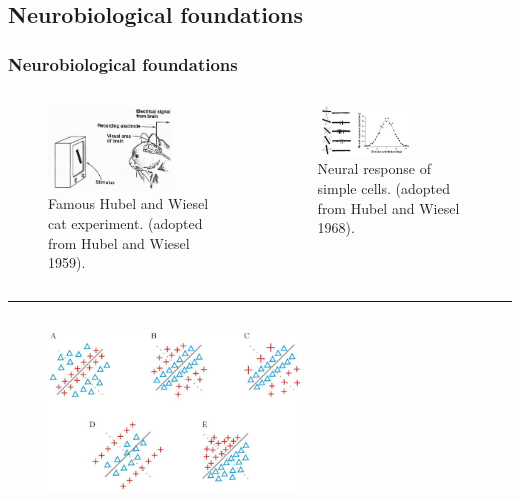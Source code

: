 \documentclass[a4paper,9pt]{beamer}
\theoremstyle{mytheoremstyle}
\begin{document}
\subsection{Neurobiological foundations}
\begin{frame}
\frametitle{Neurobiological foundations}
\begin{columns}
\begin{figure}
\begin{center}
  \includegraphics[width=0.75\textwidth]{res/hubel-experiment-cat.png}
\end{center}
	\caption{Famous Hubel and Wiesel cat experiment. (adopted from Hubel and Wiesel 1959).}
\end{figure}
\vspace{0.8cm}
\begin{figure}
\begin{center}
  \includegraphics[width=0.6\textwidth]{res/hubel-experiment-cat-2.png}
\end{center}
	\caption{Neural response of simple cells. (adopted from Hubel and Wiesel 1968).}
\end{figure}
\end{columns}
\hrule
\begin{columns}
\begin{figure}
\begin{center}
  \includegraphics[width=0.6\textwidth]{res/simple_cells.png}

\end{center}
\end{figure}
\end{columns}
\end{frame}
\end{document}
